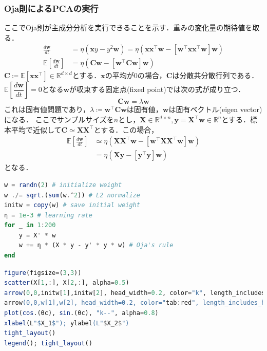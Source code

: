 \subsubsection{Oja則によるPCAの実行}
ここでOja則が主成分分析を実行できることを示す．重みの変化量の期待値を取る．
\begin{align}
\frac{d\mathbf{w}}{dt} &= \eta \left(\mathbf{x}y - y^2 \mathbf{w}\right)=\eta \left(\mathbf{x}\mathbf{x}^\top \mathbf{w} - \left[\mathbf{w}^\top \mathbf{x}\mathbf{x}^\top \mathbf{w}\right] \mathbf{w}\right)\\
\mathbb{E}\left[\frac{d\mathbf{w}}{dt}\right] &= \eta \left(\mathbf{C} \mathbf{w} - \left[\mathbf{w}^\top \mathbf{C} \mathbf{w}\right] \mathbf{w}\right)
\end{align}
$\mathbf{C}\coloneqq \mathbb{E}[\mathbf{x}\mathbf{x}^\top]\in \mathbb{R}^{d\times d}$とする．$\mathbf{x}$の平均が0の場合，$\mathbf{C}$は分散共分散行列である．$\mathbb{E}\left[\dfrac{d\mathbf{w}}{dt}\right]=0$となる$\mathbf{w}$が収束する固定点(fixed point)では次の式が成り立つ．
\begin{equation}
\mathbf{C}\mathbf{w} = \lambda \mathbf{w}
\end{equation}
これは固有値問題であり，$\lambda\coloneqq \mathbf{w}^\top \mathbf{C} \mathbf{w}$は固有値，$\mathbf{w}$は固有ベクトル(eigen vector)になる．
ここでサンプルサイズを$n$とし，$\mathbf{X} \in \mathbb{R}^{d\times n}, \mathbf{y}=\mathbf{X}^\top\mathbf{w} \in \mathbb{R}^n$とする．標本平均で近似して$\mathbf{C}\simeq \mathbf{X}\mathbf{X}^\top$とする．この場合，
\begin{align}
\mathbb{E}\left[\frac{d\mathbf{w}}{dt}\right] &\simeq \eta \left(\mathbf{X}\mathbf{X}^\top \mathbf{w} - \left[\mathbf{w}^\top \mathbf{X}\mathbf{X}^\top \mathbf{w}\right] \mathbf{w}\right)\\
&=\eta \left(\mathbf{X}\mathbf{y} - \left[\mathbf{y}^\top\mathbf{y}\right] \mathbf{w}\right)
\end{align}
となる．
\begin{lstlisting}[language=julia]
w = randn(2) # initialize weight
w ./= sqrt.(sum(w.^2)) # L2 normalize
initw = copy(w) # save initial weight
η = 1e-3 # learning rate
for _ in 1:200
    y = X' * w  
    w += η * (X * y - y' * y * w) # Oja's rule
end
\end{lstlisting}
\begin{lstlisting}[language=julia]
figure(figsize=(3,3))
scatter(X[1,:], X[2,:], alpha=0.5)
arrow(0,0,initw[1],initw[2], head_width=0.2, color="k", length_includes_head=true, label=L"Init. $w$")
arrow(0,0,w[1],w[2], head_width=0.2, color="tab:red", length_includes_head=true, label=L"Opt. $w$")
plot(cos.(θc), sin.(θc), "k--", alpha=0.8)
xlabel(L"$X_1$"); ylabel(L"$X_2$")
tight_layout()
legend(); tight_layout()
\end{lstlisting}
